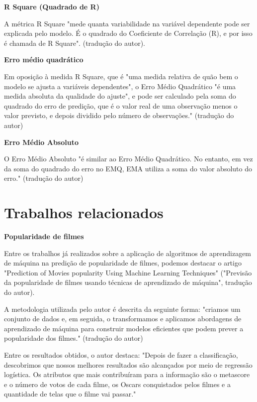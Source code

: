 	        \textbf{R Square (Quadrado de R)}\par
	        A métrica R Square "mede quanta variabilidade na variável dependente pode ser explicada pelo modelo. É o quadrado do Coeficiente de Correlação (R), e por isso é chamada de R Square". \cite{towards2020} (tradução do autor).
	
        	\textbf{Erro médio quadrático}\par
	        Em oposição à medida R Square, que é "uma medida relativa de quão bem o modelo se ajusta a variáveis dependentes", o Erro Médio Quadrático "é uma medida absoluta da qualidade do ajuste", e pode ser calculado pela soma do quadrado do erro de predição, que é o valor real de uma observação menos o valor previsto, e depois dividido pelo número de observações." \cite{towards2020} (tradução do autor)
	
	        \textbf{Erro Médio Absoluto}\par
	        O Erro Médio Absoluto "é similar ao Erro Médio Quadrático. No entanto, em vez da soma do quadrado do erro no EMQ, EMA utiliza a soma do valor absoluto do erro." \cite{towards2020} (tradução do autor)

    \section{Trabalhos relacionados}
    
        \textbf{Popularidade de filmes}\par

        Entre os trabalhos já realizados sobre a aplicação de algoritmos de aprendizagem de máquina na predição de popularidade de filmes, podemos destacar o artigo "Prediction of Movies popularity Using Machine Learning Techniques" ("Previsão da popularidade de filmes usando técnicas de aprendizado de máquina", tradução do autor).\par
        A metodologia utilizada pelo autor é descrita da seguinte forma: "criamos um conjunto de dados e, em seguida, o transformamos e aplicamos abordagens de aprendizado de máquina para construir modelos eficientes que podem prever a popularidade dos filmes." \cite{afzal2016} (tradução do autor)\par
        Entre os resultados obtidos, o autor destaca: "Depois de fazer a classificação, descobrimos que nossos melhores resultados são alcançados por meio de regressão logística. Os atributos que mais contribuíram para a informação são o metascore e o número de votos de cada filme, os Oscars conquistados pelos filmes e a quantidade de telas que o filme vai passar." \cite{afzal2016}

